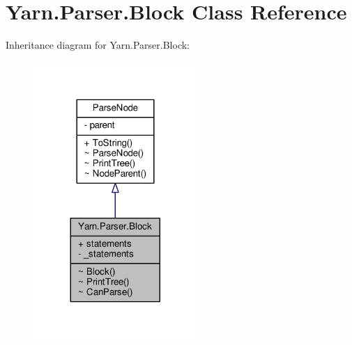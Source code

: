 \hypertarget{a00022}{\section{Yarn.\-Parser.\-Block Class Reference}
\label{a00022}
}


Inheritance diagram for Yarn.\-Parser.\-Block\-:
\nopagebreak
\begin{figure}[H]
\begin{center}
\leavevmode
\includegraphics[width=176pt]{dd/dd7/a00260}
\end{center}
\end{figure}


